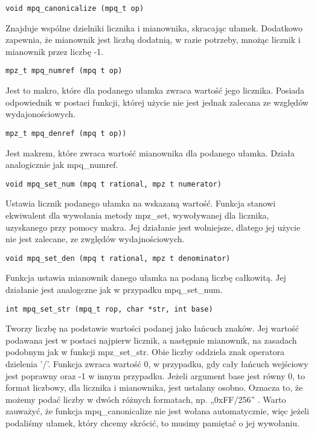 \documentclass[twoside,a4paper]{book}
\begin{document}
\begin{lstlisting}
void mpq_canonicalize (mpq_t op)
\end{lstlisting}

Znajduje wspólne dzielniki licznika i mianownika, skracając ułamek. Dodatkowo zapewnia, że mianownik jest liczbą dodatnią, w razie potrzeby, mnożąc licznik i mianownik przez liczbę -1.

\begin{lstlisting}
mpz_t mpq_numref (mpq t op)
\end{lstlisting}

Jest to makro, które dla podanego ułamka zwraca wartość jego licznika. Posiada odpowiednik w postaci funkcji, której użycie nie jest jednak zalecana ze względów wydajonościowych.

\begin{lstlisting}
mpz_t mpq_denref (mpq t op))
\end{lstlisting}

Jest makrem, które zwraca wartość mianownika dla podanego ułamka. Działa analogicznie jak mpq\_numref.

\begin{lstlisting}
void mpq_set_num (mpq t rational, mpz t numerator)
\end{lstlisting}

Ustawia licznik podanego ułamka na wskazaną wartość. Funkcja stanowi ekwiwalent dla wywołania metody mpz\_set, wywoływanej dla licznika, uzyskanego przy pomocy makra. Jej działanie jest wolniejsze, dlatego jej użycie nie jest zalecane, ze zwględów wydajnościowych.

\begin{lstlisting}
void mpq_set_den (mpq t rational, mpz t denominator)
\end{lstlisting}
Funkcja ustawia mianownik danego ułamka na podaną liczbę całkowitą. Jej działanie jest analogczne jak w przypadku mpq\_set\_num.


\begin{lstlisting}
int mpq_set_str (mpq_t rop, char *str, int base)
\end{lstlisting}

Tworzy liczbę na podstawie wartości podanej jako łańcuch znaków. Jej wartość podawana jest w postaci najpierw licznik, a następnie mianownik, na zasadach podobnym jak w funkcji mpz\_set\_str. Obie liczby oddziela znak operatora dzielenia '/'. Funkcja zwraca wartość 0, w przypadku, gdy cały łańcuch wejściowy jest poprawny oraz -1 w innym przypadku. Jeżeli argument base jest równy 0, to format liczbowy, dla licznika i mianownika, jest ustalany osobno. Oznacza to, że możemy podać liczby w dwóch różnych formatach, np. „0xFF/256” . Warto zauważyć, że funkcja mpq\_canonicalize nie jest wołana automatycznie, więc jeżeli podaliśmy ułamek, który chcemy skrócić, to musimy pamiętać o jej wywołaniu.
\end{document}
